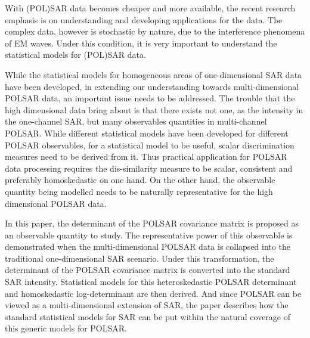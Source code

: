 \documentclass[journal]{IEEEtran}
\begin{document}
With (POL)SAR data becomes cheaper and more available, the recent research emphasis is on understanding and developing applications for the data. %
The complex data, however is stochastic by nature, due to the interference phenomena of EM waves. %
Under this condition, it is very important to understand the statistical models for (POL)SAR data.

While the statistical models for homogeneous areas of one-dimensional SAR data have been developed,
  in extending our understanding towards multi-dimensional POLSAR data, an important issue needs to be addressed.
The trouble that the high dimensional data bring about is that there exists not one, as the intensity in the one-channel SAR, but many observables quantities in multi-channel POLSAR.
While different statistical models have been developed for different POLSAR observables,
  for a statistical model to be useful, scalar discrimination measures need to be derived from it.
Thus practical application for POLSAR data processing requires the dis-similarity measure to be scalar, consistent and preferably homoskedastic on one hand.
On the other hand, the observable quantity being modelled needs to be naturally representative for the high dimensional POLSAR data.

In this paper, the determinant of the POLSAR covariance matrix is proposed as an observable quantity to study.
The representative power of this observable is demonstrated when the multi-dimensional POLSAR data is collapsed into the traditional one-dimensional SAR scenario.
Under this transformation, the determinant of the POLSAR covariance matrix is converted into the standard SAR intensity.
Statistical models for this heteroskedastic POLSAR determinant and homoskedastic log-determinant are then derived.
And since POLSAR can be viewed as a multi-dimensional extension of SAR, the paper describes how the standard statistical models for SAR can be put within the natural coverage of this generic models for POLSAR.
\end{document}
